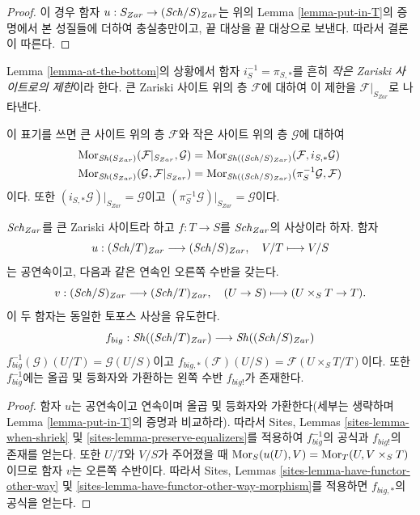 \begin{proof}
이 경우 함자 $u : S_{Zar} \to (\mathit{Sch}/S)_{Zar}$는 위의 Lemma
\ref{lemma-put-in-T}의 증명에서 본 성질들에 더하여 충실충만이고,
끝 대상을 끝 대상으로 보낸다. 따라서 결론이 따른다.
\end{proof}

\begin{definition}
\label{definition-restriction-small-zariski}
Lemma \ref{lemma-at-the-bottom}의 상황에서 함자
$i_S^{-1} = \pi_{S, *}$를 흔히 {\it 작은 Zariski 사이트로의 제한}이라
한다. 큰 Zariski 사이트 위의 층 $\mathcal{F}$에 대하여 이 제한을
$\mathcal{F}|_{S_{Zar}}$로 나타낸다.
\end{definition}

\noindent
이 표기를 쓰면 큰 사이트 위의 층 $\mathcal{F}$와 작은 사이트 위의 층
$\mathcal{G}$에 대하여
\begin{align*}
\mathop{\mathrm{Mor}}\nolimits_{\mathop{\mathit{Sh}}\nolimits(S_{Zar})}(\mathcal{F}|_{S_{Zar}}, \mathcal{G})
& =
\mathop{\mathrm{Mor}}\nolimits_{\mathop{\mathit{Sh}}\nolimits((\mathit{Sch}/S)_{Zar})}(\mathcal{F},
i_{S, *}\mathcal{G}) \\
\mathop{\mathrm{Mor}}\nolimits_{\mathop{\mathit{Sh}}\nolimits(S_{Zar})}(\mathcal{G}, \mathcal{F}|_{S_{Zar}})
& =
\mathop{\mathrm{Mor}}\nolimits_{\mathop{\mathit{Sh}}\nolimits((\mathit{Sch}/S)_{Zar})}(\pi_S^{-1}\mathcal{G},
\mathcal{F})
\end{align*}
이다. 또한 $(i_{S, *}\mathcal{G})|_{S_{Zar}} = \mathcal{G}$이고
$(\pi_S^{-1}\mathcal{G})|_{S_{Zar}} = \mathcal{G}$이다.

\begin{lemma}
\label{lemma-morphism-big}
$\mathit{Sch}_{Zar}$를 큰 Zariski 사이트라 하고
$f : T \to S$를 $\mathit{Sch}_{Zar}$의 사상이라 하자. 함자
$$
u : (\mathit{Sch}/T)_{Zar} \longrightarrow (\mathit{Sch}/S)_{Zar},
\quad
V/T \longmapsto V/S
$$
는 공연속이고, 다음과 같은 연속인 오른쪽 수반을 갖는다.
$$
v : (\mathit{Sch}/S)_{Zar} \longrightarrow (\mathit{Sch}/T)_{Zar},
\quad
(U \to S) \longmapsto (U \times_S T \to T).
$$
이 두 함자는 동일한 토포스 사상을 유도한다.
$$
f_{big} :
\mathop{\mathit{Sh}}\nolimits((\mathit{Sch}/T)_{Zar})
\longrightarrow
\mathop{\mathit{Sh}}\nolimits((\mathit{Sch}/S)_{Zar})
$$
$f_{big}^{-1}(\mathcal{G})(U/T) = \mathcal{G}(U/S)$이고
$f_{big, *}(\mathcal{F})(U/S) = \mathcal{F}(U \times_S T/T)$이다.
또한 $f_{big}^{-1}$에는 올곱 및 등화자와 가환하는 왼쪽 수반
$f_{big!}$가 존재한다.
\end{lemma}

\begin{proof}
함자 $u$는 공연속이고 연속이며 올곱 및 등화자와 가환한다(세부는
생략하며 Lemma \ref{lemma-put-in-T}의 증명과 비교하라). 따라서
Sites, Lemmas \ref{sites-lemma-when-shriek} 및
\ref{sites-lemma-preserve-equalizers}를 적용하여 $f_{big}^{-1}$의 공식과
$f_{big!}$의 존재를 얻는다. 또한 $U/T$와 $V/S$가 주어졌을 때
$\mathop{\mathrm{Mor}}\nolimits_S(u(U), V) = \mathop{\mathrm{Mor}}\nolimits_T(U, V \times_S T)$이므로 함자 $v$는 오른쪽
수반이다. 따라서 Sites, Lemmas
\ref{sites-lemma-have-functor-other-way} 및
\ref{sites-lemma-have-functor-other-way-morphism}를 적용하면
$f_{big, *}$의 공식을 얻는다.
\end{proof}

